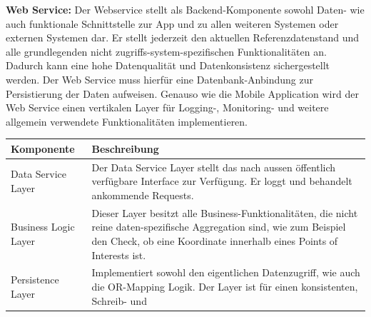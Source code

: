\documentclass[a4paper,10pt,xetex]{article}
\begin{document}
\textbf{Web Service:} Der Webservice stellt als Backend-Komponente
sowohl Daten- wie auch funktionale Schnittstelle zur App und zu allen
weiteren Systemen oder externen Systemen dar. Er stellt jederzeit den
aktuellen Referenzdatenstand und alle grundlegenden nicht
zugriffs-system-spezifischen Funktionalitäten an. Dadurch kann eine hohe
Datenqualität und Datenkonsistenz sichergestellt werden. Der Web Service
muss hierfür eine Datenbank-Anbindung zur Persistierung der Daten
aufweisen. Genauso wie die Mobile Application wird der Web Service einen
vertikalen Layer für Logging-, Monitoring- und weitere allgemein
verwendete Funktionalitäten implementieren.

\begin{longtable}[]{@{}ll@{}}
\toprule
\begin{minipage}[b]{0.11\columnwidth}\raggedright\strut
\textbf{Komponente}\strut
\end{minipage} & \begin{minipage}[b]{0.83\columnwidth}\raggedright\strut
\textbf{Beschreibung}\strut
\end{minipage}\tabularnewline
\midrule
\endhead
\begin{minipage}[t]{0.11\columnwidth}\raggedright\strut
Data Service Layer\strut
\end{minipage} & \begin{minipage}[t]{0.83\columnwidth}\raggedright\strut
Der Data Service Layer stellt das nach aussen öffentlich verfügbare
Interface zur Verfügung. Er loggt und behandelt ankommende
Requests.\strut
\end{minipage}\tabularnewline
\begin{minipage}[t]{0.11\columnwidth}\raggedright\strut
Business Logic Layer\strut
\end{minipage} & \begin{minipage}[t]{0.83\columnwidth}\raggedright\strut
Dieser Layer besitzt alle Business-Funktionalitäten, die nicht reine
daten-spezifische Aggregation sind, wie zum Beispiel den Check, ob eine
Koordinate innerhalb eines Points of Interests ist.\strut
\end{minipage}\tabularnewline
\begin{minipage}[t]{0.11\columnwidth}\raggedright\strut
Persistence Layer\strut
\end{minipage} & \begin{minipage}[t]{0.83\columnwidth}\raggedright\strut
Implementiert sowohl den eigentlichen Datenzugriff, wie auch die
OR-Mapping Logik. Der Layer ist für einen konsistenten, Schreib- und

\end{minipage}
\end{longtable}
\end{document}
